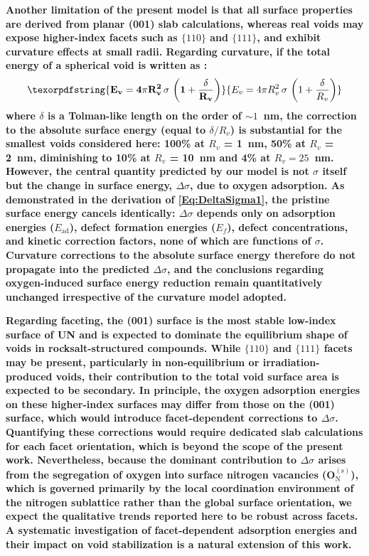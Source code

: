 \documentclass[preprint,12pt,sort&compress]{elsarticle}
\newcommand{\?}{\stackrel{?}{=}}
\providecommand{\DIFaddtex}[1]{{\bf #1}} %
\providecommand{\DIFaddbegin}{\protect\color{blue}} %
\providecommand{\DIFadd}[1]{\texorpdfstring{\DIFaddtex{#1}}{#1}} %
\newcommand{\DIFaddincludegraphics}[2][]{{\color{blue}\fbox{\DIFOincludegraphics[#1]{#2}}}} %
\DeclareRobustCommand{\DIFaddbegin}{\DIFOaddbegin \let\includegraphics\DIFaddincludegraphics} %
\begin{document}
\DIFaddbegin \DIFadd{Another limitation of the present model is that all surface properties are derived from planar (001) slab calculations, whereas real voids may expose higher-index facets such as $\{110\}$ and $\{111\}$, and exhibit curvature effects at small radii. Regarding curvature, if the total energy of a spherical void is written as \cite{Tolman1949,Chhapadia2011,Wang2021}:
}\begin{equation}
\DIFadd{E_v = 4 \pi R_v^2 \, \sigma \, \left(1 + \frac{\delta}{R_v} \right)    
}\end{equation}
\DIFadd{where $\delta$ is a Tolman-like length on the order of $\sim 1$~nm, the correction to the absolute surface energy (equal to $\delta/R_v$) is substantial for the smallest voids considered here: 100\% at $R_v$ = 1~nm, 50\% at $R_v$ = 2~nm, diminishing to 10\% at $R_v$ = 10~nm and 4\% at $R_v = 25$~nm. However, the central quantity predicted by our model is not $\sigma$ itself but the change in surface energy, $\Delta\sigma$, due to oxygen adsorption. As demonstrated in the derivation of \cref{Eq:DeltaSigma1}, the pristine surface energy cancels identically: $\Delta\sigma$ depends only on adsorption energies ($E_\mathrm{ad}$), defect formation energies ($E_f$), defect concentrations, and kinetic correction factors, none of which are functions of $\sigma$. Curvature corrections to the absolute surface energy therefore do not propagate into the predicted $\Delta\sigma$, and the conclusions regarding oxygen-induced surface energy reduction remain quantitatively unchanged irrespective of the curvature model adopted.
}

\DIFadd{Regarding faceting, the (001) surface is the most stable low-index surface of UN and is expected to dominate the equilibrium shape of voids in rocksalt-structured compounds. While $\{110\}$ and $\{111\}$ facets may be present, particularly in non-equilibrium or irradiation-produced voids, their contribution to the total void surface area is expected to be secondary. In principle, the oxygen adsorption energies on these higher-index surfaces may differ from those on the (001) surface, which would introduce facet-dependent corrections to $\Delta\sigma$. Quantifying these corrections would require dedicated slab calculations for each facet orientation, which is beyond the scope of the present work. Nevertheless, because the dominant contribution to $\Delta\sigma$ arises from the segregation of oxygen into surface nitrogen vacancies (O$_\mathrm{N}^{(\mathrm{s})}$), which is governed primarily by the local coordination environment of the nitrogen sublattice rather than the global surface orientation, we expect the qualitative trends reported here to be robust across facets. A systematic investigation of facet-dependent adsorption energies and their impact on void stabilization is a natural extension of this work.
}
\end{document}
